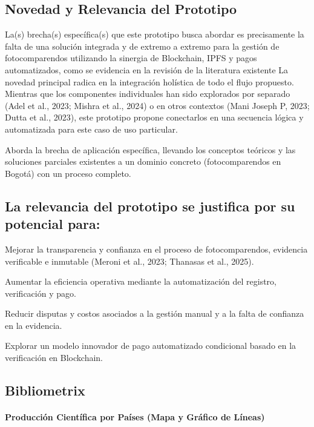 \documentclass[
    letterpaper, 
    man,   
    spanish,
    12pt,
    donotrepeattitle,
    floatsintext,
    hidelinks %
]{apa7}
\begin{document}
\subsection{Novedad y Relevancia del Prototipo} 
La(s) brecha(s) específica(s) que este prototipo busca abordar es precisamente la falta de una solución integrada y de extremo a extremo para la gestión de fotocomparendos utilizando la sinergia de Blockchain, IPFS y pagos automatizados, como se evidencia en la revisión de la literatura existente \parencite{yousfi2022its,AnandSingh_ProjectReport_Year}
La novedad principal radica en la integración holística de todo el flujo propuesto. Mientras que los componentes individuales han sido explorados por separado (Adel et al., 2023; Mishra et al., 2024) o en otros contextos (Mani Joseph P, 2023; Dutta et al., 2023), este prototipo propone conectarlos en una secuencia lógica y automatizada para este caso de uso particular. 

Aborda la brecha de aplicación específica, llevando los conceptos teóricos \parencite{swan2015blockchain, antonopoulos2023mastering} y las soluciones parciales existentes \parencite{choquevilca2024blockchain} a un dominio concreto (fotocomparendos en Bogotá) con un proceso completo. 

\subsection{La relevancia del prototipo se justifica por su potencial para:} 
Mejorar la transparencia y confianza en el proceso de fotocomparendos, evidencia verificable e inmutable (Meroni et al., 2023; Thanasas et al., 2025). 

Aumentar la eficiencia operativa mediante la automatización del registro, verificación y pago. 

Reducir disputas y costos asociados a la gestión manual y a la falta de confianza en la evidencia. 

Explorar un modelo innovador de pago automatizado condicional basado en la verificación en Blockchain. 

 \subsection{Bibliometrix}
 \paragraph{Producción Científica por Países (Mapa y Gráfico de Líneas) }
 
\end{document}
